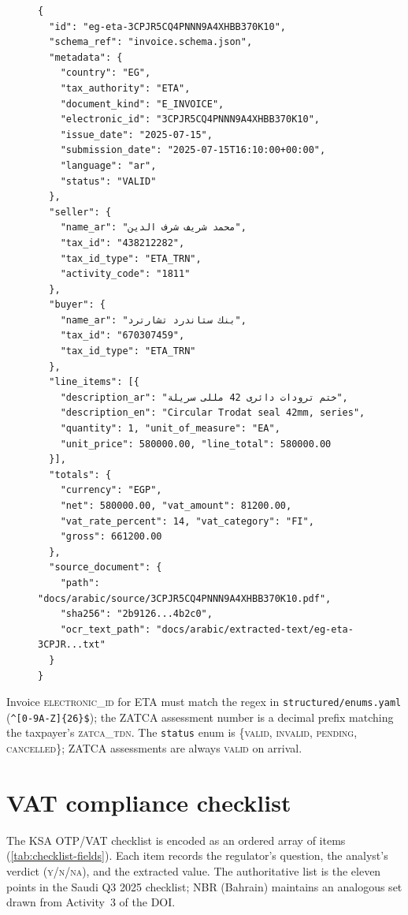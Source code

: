 \begin{figure}[htbp]
\begin{lstlisting}[language=jsonx,caption={Full invoice record for the
Egypt ETA seal invoice (\texttt{eg-eta-3CPJR5CQ4PNNN9A4XHBB370K10}).
Arabic strings are UTF-8; the LaTeX engine renders them RTL.},
label=lst:invoice-example]
{
  "id": "eg-eta-3CPJR5CQ4PNNN9A4XHBB370K10",
  "schema_ref": "invoice.schema.json",
  "metadata": {
    "country": "EG",
    "tax_authority": "ETA",
    "document_kind": "E_INVOICE",
    "electronic_id": "3CPJR5CQ4PNNN9A4XHBB370K10",
    "issue_date": "2025-07-15",
    "submission_date": "2025-07-15T16:10:00+00:00",
    "language": "ar",
    "status": "VALID"
  },
  "seller": {
    "name_ar": "محمد شريف شرف الدين",
    "tax_id": "438212282",
    "tax_id_type": "ETA_TRN",
    "activity_code": "1811"
  },
  "buyer": {
    "name_ar": "بنك ستاندرد تشارترد",
    "tax_id": "670307459",
    "tax_id_type": "ETA_TRN"
  },
  "line_items": [{
    "description_ar": "ختم ترودات دائرى 42 مللى سريلة",
    "description_en": "Circular Trodat seal 42mm, series",
    "quantity": 1, "unit_of_measure": "EA",
    "unit_price": 580000.00, "line_total": 580000.00
  }],
  "totals": {
    "currency": "EGP",
    "net": 580000.00, "vat_amount": 81200.00,
    "vat_rate_percent": 14, "vat_category": "FI",
    "gross": 661200.00
  },
  "source_document": {
    "path": "docs/arabic/source/3CPJR5CQ4PNNN9A4XHBB370K10.pdf",
    "sha256": "2b9126...4b2c0",
    "ocr_text_path": "docs/arabic/extracted-text/eg-eta-3CPJR...txt"
  }
}
\end{lstlisting}
\end{figure}

Invoice \textsc{electronic\_id} for ETA must match the regex in
\corpus\texttt{structured/enums.yaml}
(\verb|^[0-9A-Z]{26}$|); the ZATCA assessment number is a decimal prefix
matching the taxpayer's \textsc{zatca\_tdn}. The \texttt{status} enum is
\{\textsc{valid}, \textsc{invalid}, \textsc{pending}, \textsc{cancelled}\};
ZATCA assessments are always \textsc{valid} on arrival.

\section{VAT compliance checklist}

The KSA OTP/VAT checklist is encoded as an ordered array of items
(\cref{tab:checklist-fields}). Each item records the regulator's
question, the analyst's verdict (\textsc{y}/\textsc{n}/\textsc{na}), and
the extracted value. The authoritative list is the eleven points in the
Saudi Q3 2025 checklist; NBR (Bahrain) maintains an analogous set drawn
from Activity~3 of the DOI.

